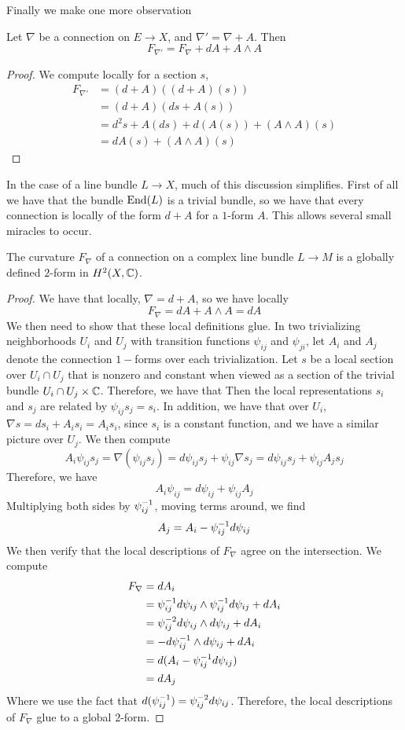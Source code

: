 %
Finally we make one more observation
%
\begin{prop}
Let $\nabla$ be a connection on $E \to X$, and $\nabla' = \nabla + A$. Then
\[
F_{\nabla'} = F_\nabla + dA + A \wedge A
\]
\end{prop}
%
\begin{proof}
We compute locally for a section $s$,
\begin{align*}
F_{\nabla'} &= (d + A)((d+A)(s)) \\
&= (d+A)(ds + A(s)) \\
&= d^2s + A(ds) + d(A(s)) + (A \wedge A)(s) \\
&= dA(s) + (A \wedge A)(s)
\end{align*}
\end{proof}
%
In the case of a line bundle $L \to X$, much of this discussion simplifies. First of all
we have that the bundle $\operatorname{End}(L)$ is a trivial bundle, so we have that every
connection is locally of the form $d + A$ for a $1$-form $A$. This allows several
small miracles to occur.
%
\begin{prop}
The curvature $F_\nabla$ of a connection on a complex line bundle $L \to M$
is a globally defined $2$-form in $H^2(X, \mathbb{C})$.
\end{prop}
%
\begin{proof}
We have that locally, $\nabla = d + A$, so we have locally
\[
F_\nabla =  dA + A \wedge A = dA
\]
We then need to show that these local definitions glue. In two trivializing
neighborhoods $U_i$ and $U_j$ with transition functions $\psi_{ij}$ and $\psi_{ji}$,
let $A_i$ and $A_j$ denote the connection $1-$forms over each trivialization.
Let $s$ be a local section over $U_i \cap U_j$ that is nonzero and constant when viewed as a
section of the trivial bundle $U_i \cap U_j \times \mathbb{C}$. Therefore, we have that
Then the local representations $s_i$ and $s_j$ are related by $\psi_{ij}s_j = s_i$.
In addition, we have that over $U_i$, $\nabla s = ds_i + A_is_i = A_is_i$, since
$s_i$ is a constant function, and we have a similar picture over $U_j$. We then
compute
\[
A_i\psi_{ij}s_j = \nabla(\psi_{ij}s_j) = d\psi_{ij}s_j + \psi_{ij}\nabla s_j
= d\psi_{ij}s_j + \psi_{ij}A_js_j
\]
Therefore, we have
\[
A_i\psi_{ij} = d\psi_{ij} + \psi_{ij}A_j
\]
Multiplying both sides by $\psi_{ij}^{-1}$, moving terms around, we find
\[
A_j = A_i - \psi_{ij}^{-1} d\psi_{ij}
\]
We then verify that the local descriptions of $F_\nabla$ agree on the intersection. We
compute
\begin{align*}
F_\nabla &= dA_i \\
&= \psi_{ij}^{-1} d\psi_{ij} \wedge \psi_{ij}^{-1} d\psi_{ij} + dA_i \\
&= \psi_{ij}^{-2}d\psi_{ij} \wedge d\psi_{ij} + dA_i \\
&= -d\psi_{ij}^{-1} \wedge d\psi_{ij} + dA_i \\
&= d(A_i - \psi_{ij}^{-1} d\psi_{ij}) \\
&= dA_j
\end{align*}
Where we use the fact that $d(\psi_{ij}^{-1}) = \psi_{ij}^{-2}d\psi_{ij}$. Therefore,
the local descriptions of $F_\nabla$ glue to a global $2$-form.
\end{proof}
